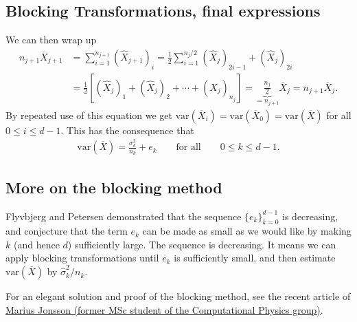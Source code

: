 \documentclass[%
oneside,                 %
final,                   %
10pt]{article}
\begin{document}
\subsection{Blocking Transformations, final expressions}

We can then wrap up
\begin{align}
n_{j+1} \overline{X}_{j+1}  &= \sum_{i=1}^{n_{j+1}} (\hat{X}_{j+1})_i =  \frac{1}{2}\sum_{i=1}^{n_{j}/2} (\hat{X}_{j})_{2i-1} + (\hat{X}_{j})_{2i} \nonumber \\
&= \frac{1}{2}\left[ (\hat{X}_j)_1 + (\hat{X}_j)_2 + \cdots + (\hat{X}_j)_{n_j} \right] = \underbrace{\frac{n_j}{2}}_{=n_{j+1}} \overline{X}_j = n_{j+1}\overline{X}_j. 
\end{align}
By repeated use of this equation we get $\mathrm{var}(\overline{X}_i) = \mathrm{var}(\overline{X}_0) = \mathrm{var}(\overline{X})$ for all $0 \leq i \leq d-1$. This has the consequence that
\begin{align}
\mathrm{var}(\overline{X}) = \frac{\sigma_k^2}{n_k} + e_k \qquad \text{for all} \qquad 0 \leq k \leq d-1. \label{eq:convergence}
\end{align}

\subsection{More on the blocking method}

Flyvbjerg and Petersen demonstrated that the sequence
$\{e_k\}_{k=0}^{d-1}$ is decreasing, and conjecture that the term
$e_k$ can be made as small as we would like by making $k$ (and hence
$d$) sufficiently large. The sequence is decreasing.
It means we can apply blocking transformations until
$e_k$ is sufficiently small, and then estimate $\mathrm{var}(\overline{X})$ by
$\widehat{\sigma}^2_k/n_k$. 

For an elegant solution and proof of the blocking method, see the recent article of \href{{https://journals.aps.org/pre/abstract/10.1103/PhysRevE.98.043304}}{Marius Jonsson (former MSc student of the Computational Physics group)}.

\end{document}
